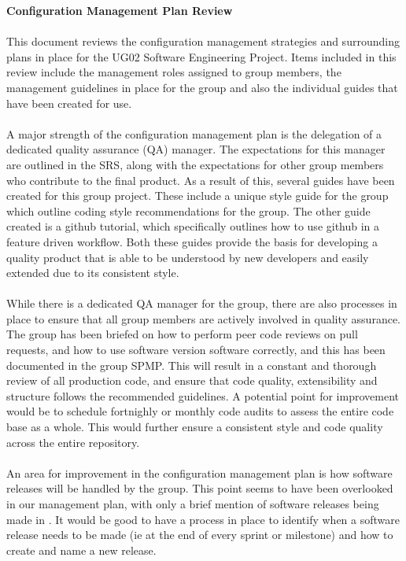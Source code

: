 \documentclass[11pt, a4paper]{article}
\begin{document}
	
	\begin{center}
		\huge \bf Configuration Management Plan Review
	\end{center}
	
	\paragraph{} {This document reviews the configuration management strategies and surrounding plans in place for the UG02 Software Engineering Project. Items included in this review include the management roles assigned to group members, the management guidelines in place for the group and also the individual guides that have been created for use.}
	\paragraph{} {A major strength of the configuration management plan is the delegation of a dedicated quality assurance (QA) manager. The expectations for this manager are outlined in the SRS, along with the expectations for other group members who contribute to the final product. As a result of this, several guides have been created for this group project. These include a unique style guide for the group which outline coding style recommendations for the group. The other guide created is a github tutorial, which specifically outlines how to use github in a feature driven workflow. Both these guides provide the basis for developing a quality product that is able to be understood by new developers and easily extended due to its consistent style. }
	\paragraph{} {While there is a dedicated QA manager for the group, there are also processes in place to ensure that all group members are actively involved in quality assurance. The group has been briefed on how to perform peer code reviews on pull requests, and how to use software version software correctly, and this has been documented in the group SPMP. This will result in a constant and thorough review of all production code, and ensure that code quality, extensibility and structure follows the recommended guidelines. A potential point for improvement would be to schedule fortnighly or monthly code audits to assess the entire code base as a whole. This would further ensure a consistent style and code quality across the entire repository. }
	\paragraph{} {An area for improvement in the configuration management plan is how software releases will be handled by the group. This point seems to have been overlooked in our management plan, with only a brief mention of software releases being made in . It would be good to have a process in place to identify when a software release needs to be made (ie at the end of every sprint or milestone) and how to create and name a new release.  }
\end{document}
